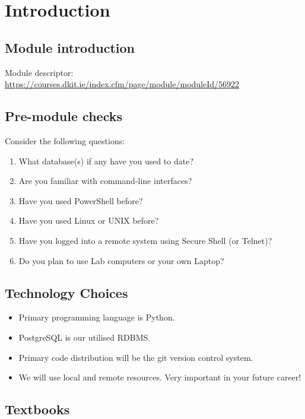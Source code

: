 \chapter{Introduction}

\section{Module introduction}

Module descriptor:\\
\url{https://courses.dkit.ie/index.cfm/page/module/moduleId/56922}


\section{Pre-module checks}

Consider the following questions: 

\begin{enumerate}
\item What database(s) if any have you used to date?
\item Are you familiar with command-line interfaces?
\item Have you used PowerShell before?
\item Have you used Linux or UNIX before?
\item Have you logged into a remote system using Secure Shell (or Telnet)?
\item Do you plan to use Lab computers or your own Laptop? 
\end{enumerate}


\section{Technology Choices}

\begin{itemize}
\item Primary programming language is Python.
\item PostgreSQL is our utilised RDBMS.
\item Primary code distribution will be the git version control system.
\item We will use local and remote resources. Very important in your future career!
\end{itemize}


\section{Textbooks}

